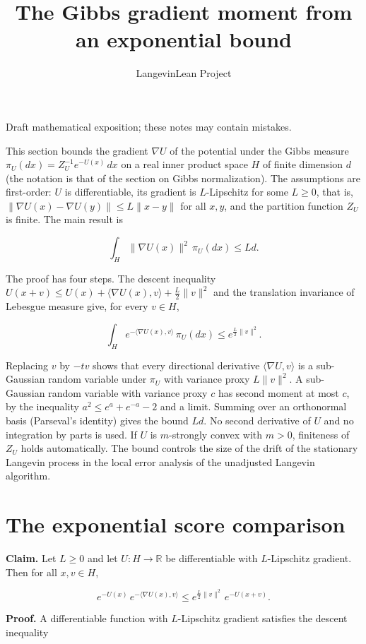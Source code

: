\documentclass[11pt,a4paper]{article}
\title{\texorpdfstring{The Gibbs gradient moment from an exponential bound}{The Gibbs gradient moment from an exponential bound}}
\author{LangevinLean Project}
\date{}
\begin{document}
\maketitle
Draft mathematical exposition; these notes may contain mistakes.


This section bounds the gradient \(\nabla U\) of the potential under the Gibbs measure \(\pi_U(dx)=Z_U^{-1}e^{-U(x)}\,dx\) on a real inner product space \(H\) of finite dimension \(d\) (the notation is that of the section on Gibbs normalization). The assumptions are first-order: \(U\) is differentiable, its gradient is \(L\)-Lipschitz for some \(L\ge0\), that is, \(\|\nabla U(x)-\nabla U(y)\|\le L\|x-y\|\) for all \(x,y\), and the partition function \(Z_U\) is finite. The main result is


\[\int_H\|\nabla U(x)\|^2\,\pi_U(dx)\le Ld.\]


The proof has four steps. The descent inequality \(U(x+v)\le U(x)+\langle\nabla U(x),v\rangle+\frac L2\|v\|^2\) and the translation invariance of Lebesgue measure give, for every \(v\in H\),


\[\int_He^{-\langle\nabla U(x),v\rangle}\,\pi_U(dx)\le e^{\frac L2\|v\|^2}.\]


Replacing \(v\) by \(-tv\) shows that every directional derivative \(\langle\nabla U,v\rangle\) is a sub-Gaussian random variable under \(\pi_U\) with variance proxy \(L\|v\|^2\). A sub-Gaussian random variable with variance proxy \(c\) has second moment at most \(c\), by the inequality \(a^2\le e^a+e^{-a}-2\) and a limit. Summing over an orthonormal basis (Parseval's identity) gives the bound \(Ld\). No second derivative of \(U\) and no integration by parts is used. If \(U\) is \(m\)-strongly convex with \(m>0\), finiteness of \(Z_U\) holds automatically. The bound controls the size of the drift of the stationary Langevin process in the local error analysis of the unadjusted Langevin algorithm.


\section{\texorpdfstring{The exponential score comparison}{The exponential score comparison}}


\textbf{Claim.} Let \(L\ge0\) and let \(U:H\to\mathbb R\) be differentiable with \(L\)-Lipschitz gradient. Then for all \(x,v\in H\),


\[e^{-U(x)}\,e^{-\langle\nabla U(x),v\rangle}\le e^{\frac L2\|v\|^2}\,e^{-U(x+v)}.\]


\textbf{Proof.} A differentiable function with \(L\)-Lipschitz gradient satisfies the descent inequality \cite[Section~3.9.1]{LangevinLean2026ULASC}
\end{document}
